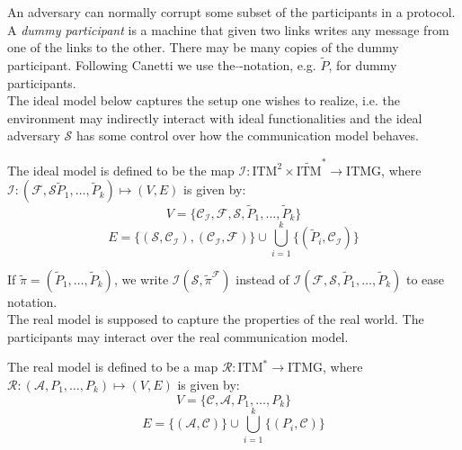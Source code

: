\documentclass{acm_proc_article-sp}
\begin{document}
An adversary can normally corrupt some subset of the participants in a protocol. A
\textit{dummy participant} is a machine that given two links writes any message from
one of the links to the other. There may be many copies of the dummy participant.
Following Canetti we use the $\tilde{}$-notation, e.g. $\tilde{P}$, for dummy participants.
\\
The ideal model below captures the setup one wishes to realize, i.e. the environment
may indirectly interact with ideal functionalities and the ideal adversary $\mathcal{S}$
has some control over how the communication model behaves.

\begin{defAppendix}
The ideal model is defined to be the map $\mathcal{I}:\textrm{ITM}^2 \times
\tilde{\textrm{ITM}}^* \to \textrm{ITMG}$, where $\mathcal{I}: (\mathcal{F}, \mathcal{S}
\tilde{P}_1, \ldots, \tilde{P}_k) \mapsto (V, E)$ is given by:
$$V = \{\mathcal{C_I}, \mathcal{F}, \mathcal{S}, \tilde{P}_1, \ldots, \tilde{P}_k\}$$
$$E = \{(\mathcal{S}, \mathcal{C_I}), (\mathcal{C_I}, \mathcal{F})\} \cup
\bigcup_{i = 1}^{k}\{(\tilde{P}_i, \mathcal{C_I})\}$$
\end{defAppendix}

If $\tilde{\pi} = (\tilde{P}_1, \ldots, \tilde{P}_k)$, we write
$\mathcal{I}(\mathcal{S}, \tilde{\pi}^\mathcal{F})$ instead of $\mathcal{I}(\mathcal{F},
\mathcal{S}, \tilde{P}_1, \ldots, \tilde{P}_k)$ to ease notation.\\
The real model is supposed to capture the properties of the real world. The participants
may interact over the real communication model.\\

\begin{defAppendix}
The real model is defined to be a map $\mathcal{R}:\textrm{ITM}^* \to \textrm{ITMG}$,
where $\mathcal{R}:(\mathcal{A}, P_1, \ldots, P_k) \mapsto (V, E)$ is given by:
$$V = \{\mathcal{C}, \mathcal{A}, P_1, \ldots, P_k\}$$
$$E = \{(\mathcal{A}, \mathcal{C})\}\cup\bigcup_{i=1}^k\{(P_i, \mathcal{C})\}$$
\end{defAppendix}
\end{document}
